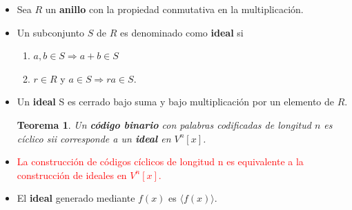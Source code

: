 \documentclass{beamer}
\theoremstyle{plain}
\newtheorem{teorema} [Teorema] {Teorema}
\theoremstyle{example}
\theoremstyle{example}
\begin{document}
\begin{frame}  \small  
\begin{itemize} 


\item Sea $R$ un \textbf{anillo} con la propiedad conmutativa en la multiplicación. 

\item Un subconjunto $S$ de $R$ es denominado como \textbf{ideal} si
\begin{enumerate}
\item  $a,b \in S \Rightarrow a+b \in S$ 
\item  $r\in R$ y $ a\in S \Rightarrow ra 	\in S$.
\end{enumerate}

\item  Un \textbf{ideal} S es cerrado bajo suma y bajo multiplicación por un elemento de $R$.

\begin{teorema}
Un \textbf{código binario} con palabras codificadas de longitud $n$ es cíclico sii corresponde a un \textbf{ideal} en $V^n[x]$.
\end{teorema}

\item \textcolor{red}{La construcción de códigos cíclicos de longitud n es equivalente a la construcción de ideales en $V^n[x]$.}



\item El \textbf{ideal} generado mediante $f(x)$ es $\langle f (x)\rangle$.

\end{itemize} \end{frame} 
\end{document}
